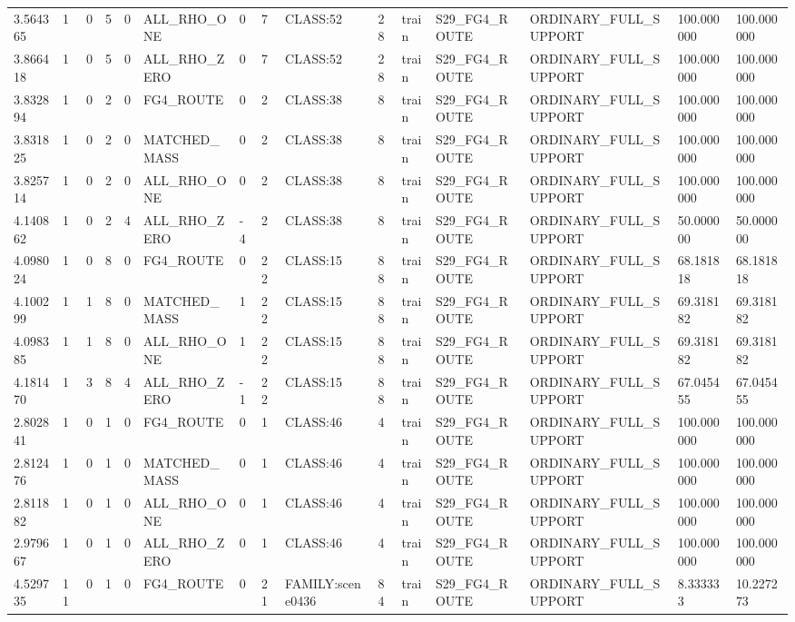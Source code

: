 \begin{tabular}{lllllllllllllll}
3.564365 & 1 & 0 & 5 & 0 & ALL\_RHO\_ONE & 0 & 7 & CLASS:52 & 28 & train & S29\_FG4\_ROUTE & ORDINARY\_FULL\_SUPPORT & 100.000000 & 100.000000 \\
3.866418 & 1 & 0 & 5 & 0 & ALL\_RHO\_ZERO & 0 & 7 & CLASS:52 & 28 & train & S29\_FG4\_ROUTE & ORDINARY\_FULL\_SUPPORT & 100.000000 & 100.000000 \\
3.832894 & 1 & 0 & 2 & 0 & FG4\_ROUTE & 0 & 2 & CLASS:38 & 8 & train & S29\_FG4\_ROUTE & ORDINARY\_FULL\_SUPPORT & 100.000000 & 100.000000 \\
3.831825 & 1 & 0 & 2 & 0 & MATCHED\_MASS & 0 & 2 & CLASS:38 & 8 & train & S29\_FG4\_ROUTE & ORDINARY\_FULL\_SUPPORT & 100.000000 & 100.000000 \\
3.825714 & 1 & 0 & 2 & 0 & ALL\_RHO\_ONE & 0 & 2 & CLASS:38 & 8 & train & S29\_FG4\_ROUTE & ORDINARY\_FULL\_SUPPORT & 100.000000 & 100.000000 \\
4.140862 & 1 & 0 & 2 & 4 & ALL\_RHO\_ZERO & -4 & 2 & CLASS:38 & 8 & train & S29\_FG4\_ROUTE & ORDINARY\_FULL\_SUPPORT & 50.000000 & 50.000000 \\
4.098024 & 1 & 0 & 8 & 0 & FG4\_ROUTE & 0 & 22 & CLASS:15 & 88 & train & S29\_FG4\_ROUTE & ORDINARY\_FULL\_SUPPORT & 68.181818 & 68.181818 \\
4.100299 & 1 & 1 & 8 & 0 & MATCHED\_MASS & 1 & 22 & CLASS:15 & 88 & train & S29\_FG4\_ROUTE & ORDINARY\_FULL\_SUPPORT & 69.318182 & 69.318182 \\
4.098385 & 1 & 1 & 8 & 0 & ALL\_RHO\_ONE & 1 & 22 & CLASS:15 & 88 & train & S29\_FG4\_ROUTE & ORDINARY\_FULL\_SUPPORT & 69.318182 & 69.318182 \\
4.181470 & 1 & 3 & 8 & 4 & ALL\_RHO\_ZERO & -1 & 22 & CLASS:15 & 88 & train & S29\_FG4\_ROUTE & ORDINARY\_FULL\_SUPPORT & 67.045455 & 67.045455 \\
2.802841 & 1 & 0 & 1 & 0 & FG4\_ROUTE & 0 & 1 & CLASS:46 & 4 & train & S29\_FG4\_ROUTE & ORDINARY\_FULL\_SUPPORT & 100.000000 & 100.000000 \\
2.812476 & 1 & 0 & 1 & 0 & MATCHED\_MASS & 0 & 1 & CLASS:46 & 4 & train & S29\_FG4\_ROUTE & ORDINARY\_FULL\_SUPPORT & 100.000000 & 100.000000 \\
2.811882 & 1 & 0 & 1 & 0 & ALL\_RHO\_ONE & 0 & 1 & CLASS:46 & 4 & train & S29\_FG4\_ROUTE & ORDINARY\_FULL\_SUPPORT & 100.000000 & 100.000000 \\
2.979667 & 1 & 0 & 1 & 0 & ALL\_RHO\_ZERO & 0 & 1 & CLASS:46 & 4 & train & S29\_FG4\_ROUTE & ORDINARY\_FULL\_SUPPORT & 100.000000 & 100.000000 \\
4.529735 & 11 & 0 & 1 & 0 & FG4\_ROUTE & 0 & 21 & FAMILY:scene0436 & 84 & train & S29\_FG4\_ROUTE & ORDINARY\_FULL\_SUPPORT & 8.333333 & 10.227273 \\

\end{tabular}
